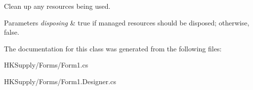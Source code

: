 Clean up any resources being used. 


\begin{DoxyParams}{Parameters}
{\em disposing} & true if managed resources should be disposed; otherwise, false.\\
\hline
\end{DoxyParams}


The documentation for this class was generated from the following files\+:\begin{DoxyCompactItemize}
\item 
H\+K\+Supply/\+Forms/Form1.\+cs\item 
H\+K\+Supply/\+Forms/Form1.\+Designer.\+cs\end{DoxyCompactItemize}
